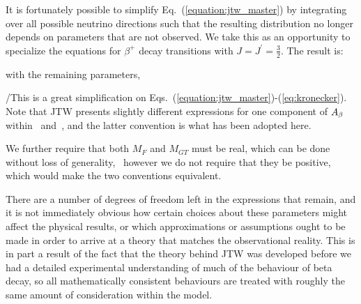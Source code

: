 It is fortunately possible to simplify Eq.~(\ref{equation:jtw_master}) by integrating over all possible neutrino directions %
such that the resulting distribution no longer depends on parameters that are not observed.  
%
We take this as an opportunity to specialize the equations for $\beta^+$ decay transitions with $J = J^\prime = \frac{3}{2}$. The result 
is:

\unskip with the remaining parameters,

\unskip \!\!/This is a great simplification on Eqs.~(\ref{equation:jtw_master})-(\ref{eq:kronecker}).  
Note that JTW presents slightly different expressions for one component of $A_{\beta}$ within~\cite{jtw} and~\cite{jtw_coulomb}, and the latter convention is what has been adopted here.  

We further require that both $M_F$ and $M_{GT}$ must be real, which can be done without loss of generality,~ however we do not require that they be positive, which would make the two conventions equivalent.  

There are a number of degrees of freedom left in the expressions that remain, and it is not immediately obvious how certain choices about these parameters might affect the physical results, or which approximations or assumptions ought to be made in order to arrive at a theory that matches the observational reality.  This is in part a result of the fact that the theory behind \ac{JTW} was developed before we had a detailed experimental understanding of much of the behaviour of beta decay, so all mathematically consistent behaviours are treated with roughly the same amount of consideration within the model.  

